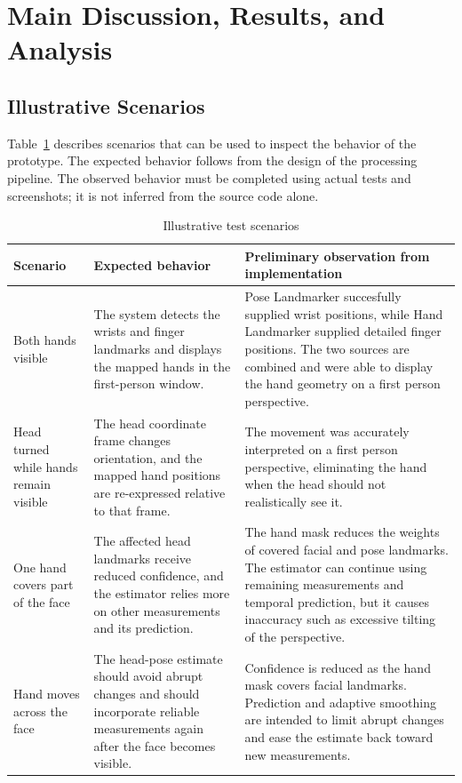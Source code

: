 \documentclass[12pt,a4paper]{article}
\begin{document}
\section{Main Discussion, Results, and Analysis}

\subsection{Illustrative Scenarios}

Table~\ref{tab:scenarios} describes scenarios that can be used to inspect the behavior of the prototype. The expected behavior follows from the design of the processing pipeline. The observed behavior must be completed using actual tests and screenshots; it is not inferred from the source code alone.

\begin{table}[h!]
    \centering
    \caption{Illustrative test scenarios}
    \label{tab:scenarios}
    \small
    \begin{tabular}{>{\raggedright\arraybackslash}p{3.0cm} >{\raggedright\arraybackslash}p{5.3cm} >{\raggedright\arraybackslash}p{6.1cm}}
        \toprule
        Scenario & Expected behavior & Preliminary observation from implementation \\
        \midrule
        Both hands visible & The system detects the wrists and finger landmarks and displays the mapped hands in the first-person window. & Pose Landmarker succesfully supplied wrist positions, while Hand Landmarker supplied detailed finger positions. The two sources are combined and were able to display the hand geometry on a first person perspective.\\
        Head turned while hands remain visible & The head coordinate frame changes orientation, and the mapped hand positions are re-expressed relative to that frame. & The movement was accurately interpreted on a first person perspective, eliminating the hand when the head should not realistically see it.\\
        One hand covers part of the face & The affected head landmarks receive reduced confidence, and the estimator relies more on other measurements and its prediction. & The hand mask reduces the weights of covered facial and pose landmarks. The estimator can continue using remaining measurements and temporal prediction, but it causes inaccuracy such as excessive tilting of the perspective.\\
        Hand moves across the face & The head-pose estimate should avoid abrupt changes and should incorporate reliable measurements again after the face becomes visible. & Confidence is reduced as the hand mask covers facial landmarks. Prediction and adaptive smoothing are intended to limit abrupt changes and ease the estimate back toward new measurements. \\

\end{tabular}
\end{table}
\end{document}
